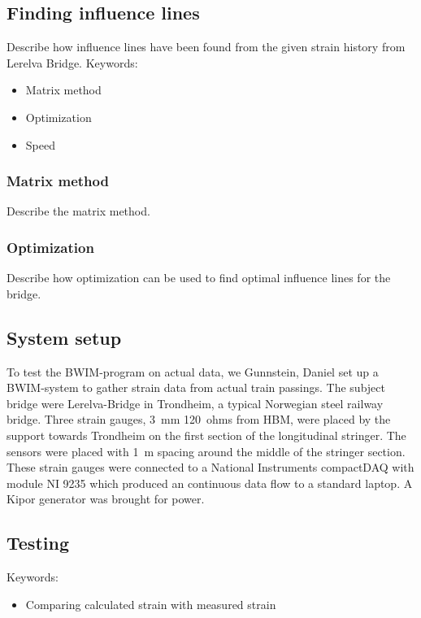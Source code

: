 \subsection{Finding influence lines}
Describe how influence lines have been found from the given strain history from Lerelva Bridge. 
Keywords:
\begin{itemize}
\item Matrix method
\item Optimization
\item Speed
\end{itemize}
\subsubsection{Matrix method}
Describe the matrix method.

\subsubsection{Optimization}
Describe how optimization can be used to find optimal influence lines for the bridge.

\subsection{System setup}
To test the BWIM-program on actual data, we Gunnstein, Daniel set up a BWIM-system to gather strain data from actual train passings. The subject bridge were Lerelva-Bridge in Trondheim, a typical Norwegian steel railway bridge. Three strain gauges, \SI{3}{\mm} \SI{120}{ohms} from HBM, were placed by the support towards Trondheim on the first section of the longitudinal stringer. The sensors were placed with \SI{1}{\m} spacing around the middle of the stringer section. These strain gauges were connected to a National Instruments compactDAQ with module NI 9235 which produced an continuous data flow to a standard laptop. A Kipor generator was brought for power.


\subsection{Testing}
Keywords:
\begin{itemize}
\item Comparing calculated strain with measured strain
\end{itemize}